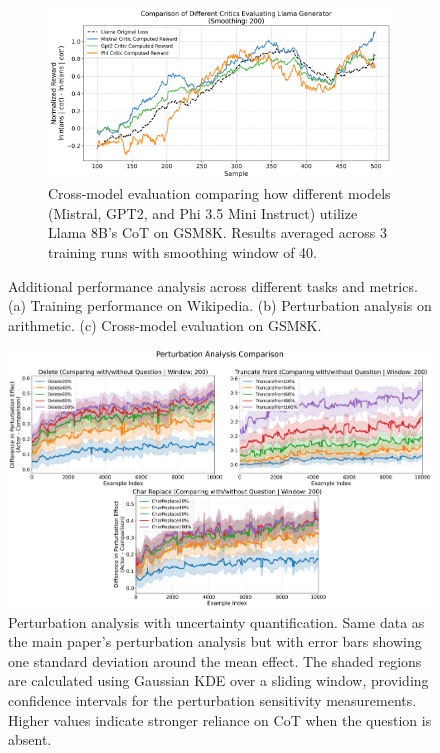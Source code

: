 \documentclass{article}
\begin{document}
\begin{figure}[ht]
    \begin{subfigure}[b]{0.6\textwidth}
        \centering
        \includegraphics[width=\textwidth]{Figures/gsm8k_multiple_critics_comparison.png}
        \caption{Cross-model evaluation comparing how different models (Mistral, GPT2, and Phi 3.5 Mini Instruct) utilize Llama 8B's CoT on GSM8K. Results averaged across 3 training runs with smoothing window of 40.}
        \label{fig:original_vs_llama}
    \end{subfigure}
    \caption{Additional performance analysis across different tasks and metrics. (a) Training performance on Wikipedia. (b) Perturbation analysis on arithmetic. (c) Cross-model evaluation on GSM8K.}
    \label{fig:additional_analysis}
\end{figure}

\begin{figure}[ht]
    \centering
    \includegraphics[width=\textwidth]{Figures/combined_perturbation_plot_comparison_question_centered_with_kde.png}
    \caption{Perturbation analysis with uncertainty quantification. Same data as the main paper's perturbation analysis but with error bars showing one standard deviation around the mean effect. The shaded regions are calculated using Gaussian KDE over a sliding window, providing confidence intervals for the perturbation sensitivity measurements. Higher values indicate stronger reliance on CoT when the question is absent.}
    \label{fig:perturbation_with_uncertainty}
\end{figure}
\end{document}
